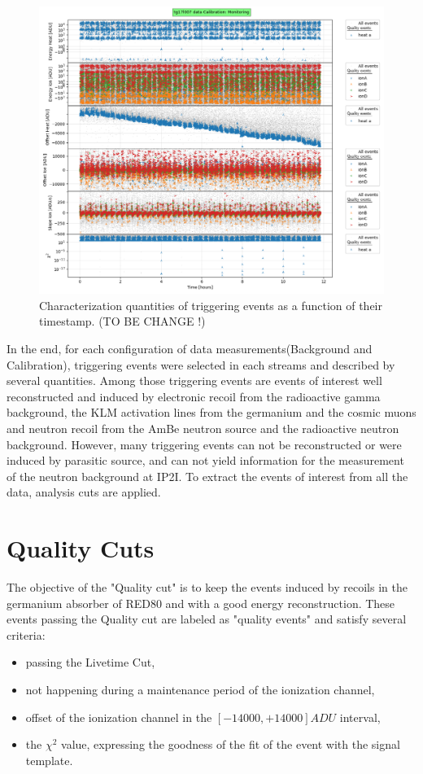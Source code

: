 \begin{figure}
\centering
\includegraphics[width=\linewidth,]{Figures/Neutron/analysis_monitoring_demo.png}
\caption{Characterization quantities of triggering events as a function of their timestamp. (TO BE CHANGE !)}
\label{fig:analysis-monitoring-demo}
\end{figure}

In the end, for each configuration of data measurements(Background and Calibration), triggering events were selected in each streams and described by several quantities.
Among those triggering events are events of interest well reconstructed and induced by electronic recoil from the radioactive gamma background, the KLM activation lines from the germanium and the cosmic muons and neutron recoil from the AmBe neutron source and the radioactive neutron background. However, many triggering events can not be reconstructed or were induced by parasitic source, and can not yield information for the measurement of the neutron background at IP2I. To extract the events of interest from all the data, analysis cuts are applied.


\section{Quality Cuts}
\label{par:quality-cuts}

The objective of the "Quality cut" is to keep the events induced by recoils in the germanium absorber of RED80 and with a good energy reconstruction. These events  passing the Quality cut are labeled as "quality events" and satisfy several criteria:
\begin{itemize}
	\item passing the Livetime Cut,
	\item not happening during a maintenance period of the ionization channel,
	\item offset of the ionization channel in the $[-14000, +14000] ADU$ interval,
	\item the $\chi^2$ value, expressing the goodness of the fit of the event with the signal template.
\end{itemize}

